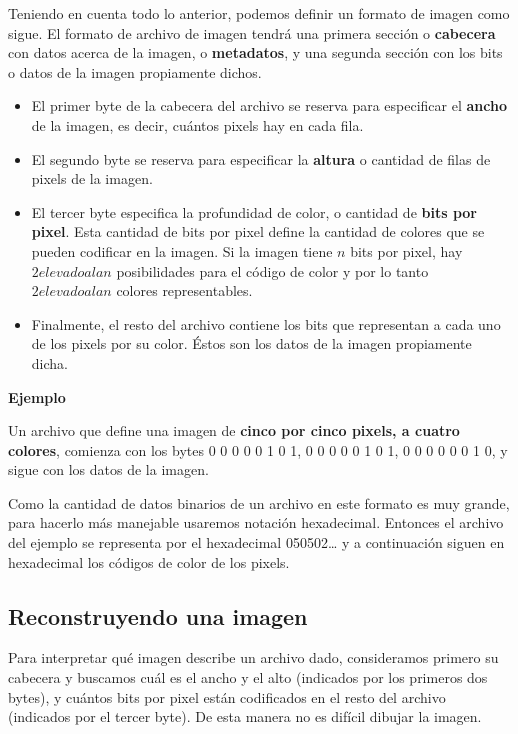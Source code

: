 \documentclass[spanish,A4,]{article}
\begin{document}
Teniendo en cuenta todo lo anterior, podemos definir un formato de
imagen como sigue. El formato de archivo de imagen tendrá una primera
sección o \textbf{cabecera} con datos acerca de la imagen, o
\textbf{metadatos}, y una segunda sección con los bits o datos de la
imagen propiamente dichos.

\begin{itemize}
\itemsep1pt\parskip0pt
\item
  El primer byte de la cabecera del archivo se reserva para especificar
  el \textbf{ancho} de la imagen, es decir, cuántos pixels hay en cada
  fila.
\item
  El segundo byte se reserva para especificar la \textbf{altura} o
  cantidad de filas de pixels de la imagen.
\item
  El tercer byte especifica la profundidad de color, o cantidad de
  \textbf{bits por pixel}. Esta cantidad de bits por pixel define la
  cantidad de colores que se pueden codificar en la imagen. Si la imagen
  tiene $n$ bits por pixel, hay $2 elevado a la n$ posibilidades para el código de
  color y por lo tanto $2 elevado a la n$ colores representables.
\item
  Finalmente, el resto del archivo contiene los bits que representan a
  cada uno de los pixels por su color. Éstos son los datos de la imagen
  propiamente dicha.
\end{itemize}

\textbf{Ejemplo}

Un archivo que define una imagen de \textbf{cinco por cinco pixels, a
cuatro colores}, comienza con los bytes 0 0 0 0 0 1 0 1, 0 0 0 0 0 1 0 1, 0 0 0 0 0 0 1 0, y
sigue con los datos de la imagen.

Como la cantidad de datos binarios de un archivo en este formato es muy
grande, para hacerlo más manejable usaremos notación hexadecimal.
Entonces el archivo del ejemplo se representa por el hexadecimal
050502\ldots{} y a continuación siguen en hexadecimal los códigos de
color de los pixels.

\subsection{Reconstruyendo una imagen}\label{reconstruyendo-una-imagen}

Para interpretar qué imagen describe un archivo dado, consideramos
primero su cabecera y buscamos cuál es el ancho y el alto (indicados por
los primeros dos bytes), y cuántos bits por pixel están codificados en
el resto del archivo (indicados por el tercer byte). De esta manera no
es difícil dibujar la imagen.
\end{document}
